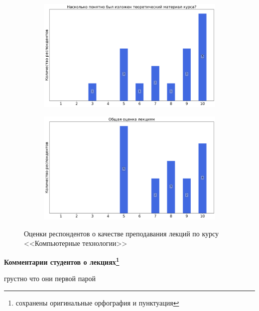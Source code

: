 \begin{figure}[H]
\begin{subfigure}[b]{0.45\textwidth}
			\end{subfigure}
			\begin{subfigure}[b]{0.45\textwidth}
				\centering
				\includegraphics[width=\textwidth]{images/2 course/Компьютерные технологии/lecturer-marks-Ефанов Н.Н.-2.png}
			\end{subfigure}	
			\begin{subfigure}[b]{0.45\textwidth}
				\centering
				\includegraphics[width=\textwidth]{images/2 course/Компьютерные технологии/lecturer-marks-Ефанов Н.Н.-3.png}
			\end{subfigure}
			\caption{Оценки респондентов о качестве преподавания лекций по курсу <<Компьютерные технологии>>}
		\end{figure}

		\textbf{Комментарии студентов о лекциях\protect\footnote{сохранены оригинальные орфография и пунктуация}}
            \begin{commentbox} 
                грустно что они первой парой  
            \end{commentbox} 
        
